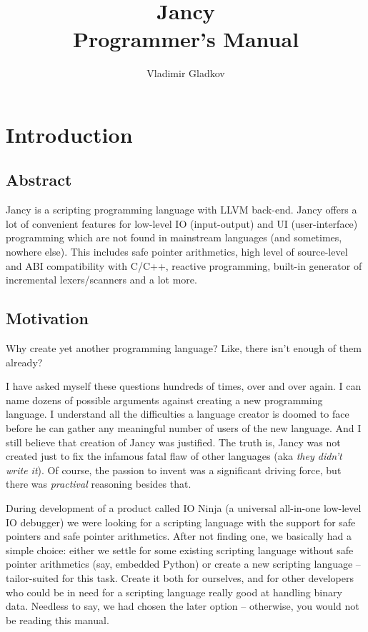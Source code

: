 \documentclass[oneside]{book}
\title{Jancy\\Programmer's Manual}
\author{Vladimir Gladkov}
\begin{document}
\maketitle
\thispagestyle{empty}
\newpage
\tableofcontents

\chapter{Introduction}

\section{Abstract}

Jancy is a scripting programming language with LLVM back-end. Jancy offers a lot of convenient features for low-level IO (input-output) and UI (user-interface) programming which are not found in mainstream languages (and sometimes, nowhere else). This includes safe pointer arithmetics, high level of source-level and ABI compatibility with C/C++, reactive programming, built-in generator of incremental lexers/scanners and a lot more.

\section{Motivation}

Why create yet another programming language? Like, there isn't enough of them already?

I have asked myself these questions hundreds of times, over and over again. I can name dozens of possible arguments against creating a new programming language. I understand all the difficulties a language creator is doomed to face before he can gather any meaningful number of users of the new language. And I still believe that creation of Jancy was justified. The truth is, Jancy was not created just to fix the infamous fatal flaw of other languages (aka \emph{they didn't write it}). Of course, the passion to invent was a significant driving force, but there was \emph{practival} reasoning besides that. 

During development of a product called IO Ninja (a universal all-in-one low-level IO debugger) we were looking for a scripting language with the support for safe pointers and safe pointer arithmetics. After not finding one, we basically had a simple choice: either we settle for some existing scripting language without safe pointer arithmetics (say, embedded Python) or create a new scripting language -- tailor-suited for this task. Create it both for ourselves, and for other developers who could be in need for a scripting language really good at handling binary data. Needless to say, we had chosen the later option -- otherwise, you would not be reading this manual.
\end{document}
